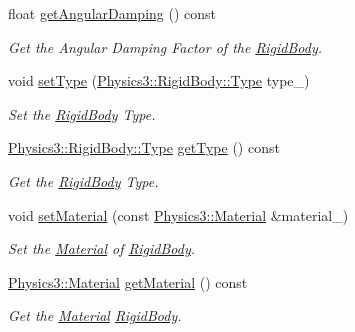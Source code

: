 \begin{DoxyCompactItemize}
float \hyperlink{class_i_dream_sky_1_1_physics3_1_1_rigid_body_ac0cdf429a507a5237ef84825d883ea1b}{get\+Angular\+Damping} () const 
\begin{DoxyCompactList}\small\item\em Get the Angular Damping Factor of the \hyperlink{class_i_dream_sky_1_1_physics3_1_1_rigid_body}{Rigid\+Body}. \end{DoxyCompactList}\item 
void \hyperlink{class_i_dream_sky_1_1_physics3_1_1_rigid_body_a508230d75ce92867d248c34b82465c10}{set\+Type} (\hyperlink{class_i_dream_sky_1_1_physics3_1_1_rigid_body_a8a970d66442558ce0a3ce7b8009c14fa}{Physics3\+::\+Rigid\+Body\+::\+Type} type\+\_\+)
\begin{DoxyCompactList}\small\item\em Set the \hyperlink{class_i_dream_sky_1_1_physics3_1_1_rigid_body}{Rigid\+Body} Type. \end{DoxyCompactList}\item 
\hyperlink{class_i_dream_sky_1_1_physics3_1_1_rigid_body_a8a970d66442558ce0a3ce7b8009c14fa}{Physics3\+::\+Rigid\+Body\+::\+Type} \hyperlink{class_i_dream_sky_1_1_physics3_1_1_rigid_body_a7963a89eac63988e41d93e444d89a243}{get\+Type} () const 
\begin{DoxyCompactList}\small\item\em Get the \hyperlink{class_i_dream_sky_1_1_physics3_1_1_rigid_body}{Rigid\+Body} Type. \end{DoxyCompactList}\item 
void \hyperlink{class_i_dream_sky_1_1_physics3_1_1_rigid_body_abde660e6ae2336bc6b5ae0e8f5219bd7}{set\+Material} (const \hyperlink{class_i_dream_sky_1_1_physics3_1_1_material}{Physics3\+::\+Material} \&material\+\_\+)
\begin{DoxyCompactList}\small\item\em Set the \hyperlink{class_i_dream_sky_1_1_physics3_1_1_material}{Material} of \hyperlink{class_i_dream_sky_1_1_physics3_1_1_rigid_body}{Rigid\+Body}. \end{DoxyCompactList}\item 
\hyperlink{class_i_dream_sky_1_1_physics3_1_1_material}{Physics3\+::\+Material} \hyperlink{class_i_dream_sky_1_1_physics3_1_1_rigid_body_ad3ac34c2a9ca4d357911596493781cbe}{get\+Material} () const 
\begin{DoxyCompactList}\small\item\em Get the \hyperlink{class_i_dream_sky_1_1_physics3_1_1_material}{Material} \hyperlink{class_i_dream_sky_1_1_physics3_1_1_rigid_body}{Rigid\+Body}. \end{DoxyCompactList}\item 

\end{DoxyCompactItemize}
